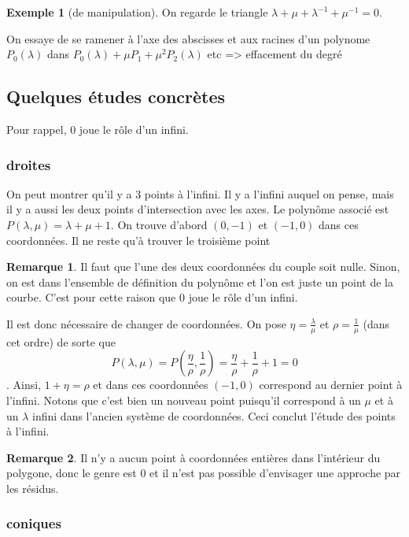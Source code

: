 \documentclass{article}
\theoremstyle{definition} %
\newtheorem{rmq}{Remarque}
\newtheorem{ex}{Exemple}
\newcommand{\1}{\mathbb{1}} %
\begin{document}
\begin{ex}[de manipulation]
On regarde le triangle $\lambda + \mu + \lambda^{-1} + \mu^{-1} = 0$.
\end{ex}

On essaye de se ramener à l'axe des abscisses et aux racines d'un polynome $P_0(\lambda)$ dans $P_0(\lambda) + \mu P_1 + \mu^2 P_2(\lambda)$ etc
=> effacement du degré

\subsection{Quelques études concrètes}

Pour rappel, 0 joue le rôle d'un infini.


\subsubsection{droites}

On peut montrer qu'il y a 3 points à l'infini.
Il y a l'infini auquel on pense, mais il y a aussi les deux points d'intersection avec les axes.
Le polynôme associé est $P(\lambda,\mu)=\lambda + \mu + 1$.
On trouve d'abord $(0,-1)$ et $(-1,0)$ dans ces coordonnées.
Il ne reste qu'à trouver le troisième point

\begin{rmq}
Il faut que l'une des deux coordonnées du couple soit nulle. Sinon, on est dans l'ensemble de définition du polynôme et l'on est juste un point de la courbe.
C'est pour cette raison que 0 joue le rôle d'un infini.
\end{rmq}

Il est donc nécessaire de changer de coordonnées.
On pose  $\eta=\frac{\lambda}{\mu}$ et $\rho= \frac{1}{\mu} $ (dans cet ordre) de sorte que
$$P(\lambda,\mu)=P(\frac{\eta}{\rho},\frac{1}{\rho})=\frac{\eta}{\rho} +\frac{1}{\rho} + 1=0$$.
Ainsi, $1 + \eta =\rho$ et dans ces coordonnées $(-1,0)$ correspond au dernier point à l'infini.
Notons que c'est bien un nouveau point puisqu'il correspond à un $\mu$ et à un $\lambda$ infini dans l'ancien système de coordonnées.
Ceci conclut l'étude des points à l'infini.

\begin{rmq}
Il n'y a aucun point à coordonnées entières dans l'intérieur du polygone, donc le genre est 0 et il n'est pas possible d'envisager une approche par les résidus.
\end{rmq}


\subsubsection{coniques}
\end{document}
